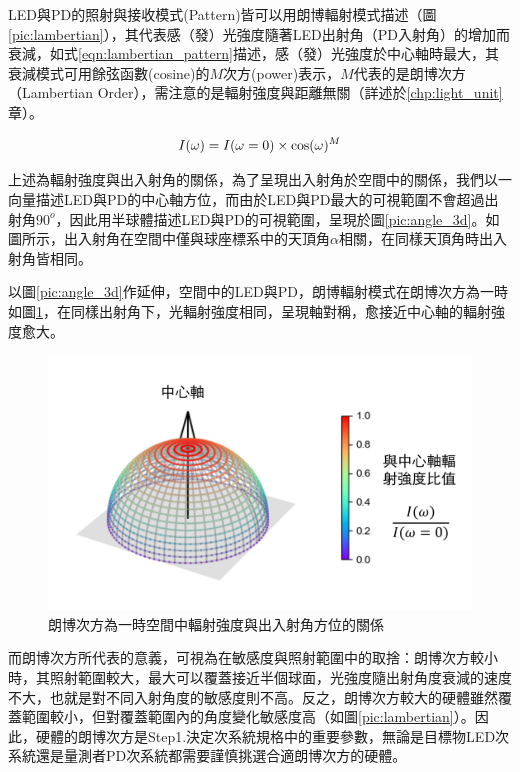         LED與PD的照射與接收模式(Pattern)皆可以用朗博輻射模式描述（圖\ref{pic:lambertian}），其代表感（發）光強度隨著LED出射角（PD入射角）的增加而衰減，如式\ref{eqn:lambertian_pattern}描述，感（發）光強度於中心軸時最大，其衰減模式可用餘弦函數(cosine)的$M$次方(power)表示，$M$代表的是朗博次方（Lambertian Order），需注意的是輻射強度與距離無關（詳述於\ref{chp:light_unit}章）。

        \begin{equation}
            \label{eqn:lambertian_pattern}
            I(\omega)=I(\omega=0)\times\cos(\omega)^{M}\\
        \end{equation}


        上述為輻射強度與出入射角的關係，為了呈現出入射角於空間中的關係，我們以一向量描述LED與PD的中心軸方位，而由於LED與PD最大的可視範圍不會超過出射角$90^{o}$，因此用半球體描述LED與PD的可視範圍，呈現於圖\ref{pic:angle_3d}。如圖所示，出入射角在空間中僅與球座標系中的天頂角$\alpha$相關，在同樣天頂角時出入射角皆相同。

        以圖\ref{pic:angle_3d}作延伸，空間中的LED與PD，朗博輻射模式在朗博次方為一時如圖\ref{pic:lambertian_3d}，在同樣出射角下，光輻射強度相同，呈現軸對稱，愈接近中心軸的輻射強度愈大。

        

        \begin{figure}[htpb]
            \centering
            \includegraphics[width=12cm]{ch2pic/lambertian_3d.png}
            \caption{朗博次方為一時空間中輻射強度與出入射角方位的關係}
            \label{pic:lambertian_3d}
        \end{figure}

        而朗博次方所代表的意義，可視為在敏感度與照射範圍中的取捨：朗博次方較小時，其照射範圍較大，最大可以覆蓋接近半個球面，光強度隨出射角度衰減的速度不大，也就是對不同入射角度的敏感度則不高。反之，朗博次方較大的硬體雖然覆蓋範圍較小，但對覆蓋範圍內的角度變化敏感度高（如圖\ref{pic:lambertian}）。因此，硬體的朗博次方是Step1.決定次系統規格中的重要參數，無論是目標物LED次系統還是量測者PD次系統都需要謹慎挑選合適朗博次方的硬體。
        
